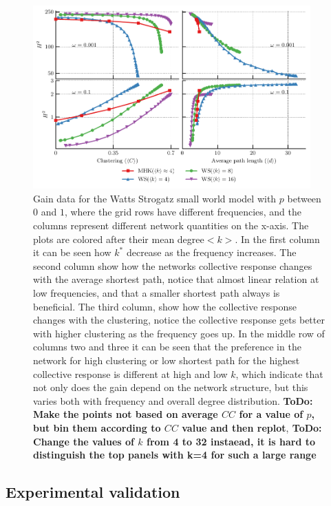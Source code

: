 \documentclass[fleqn,10pt]{wlscirep}
\newcommand{\TODO}[1]{{\bf {\color{red} ToDo:} #1}}
\begin{document}
\begin{figure}[hbtp]
  \includegraphics[width=0.95\textwidth]{fig/prop_cmp.pdf}
  \caption{Gain data for the Watts Strogatz small world model with $p$ between $0$ and $1$, where the grid rows have different frequencies, and the columns represent different network quantities on the x-axis. The plots are colored after their mean degree$<k>$. In the first column it can be seen how $k^*$ decrease as the frequency increases. The second column show how the networks collective response changes with the average shortest path, notice that almost linear relation at low frequencies, and that a smaller shortest path always is beneficial. The third column, show how the collective response changes with the clustering, notice the collective response gets better with higher clustering as the frequency goes up. In the middle row of columns two and three it can be seen that the preference in the network for high clustering or low shortest path for the highest collective response is different at high and low $k$, which indicate that not only does the gain depend on the network structure, but this varies both with frequency and overall degree distribution. \TODO{Make the points not based on average $CC$ for a value of $p$, but bin them according to $CC$ value and then replot},\TODO{Change the values of $k$ from 4 to 32 instaead, it is hard to distinguish the top panels with k=4 for such a large range}}
\label{fig:prop_cmp}
\end{figure}


\subsection*{Experimental validation}
\end{document}
